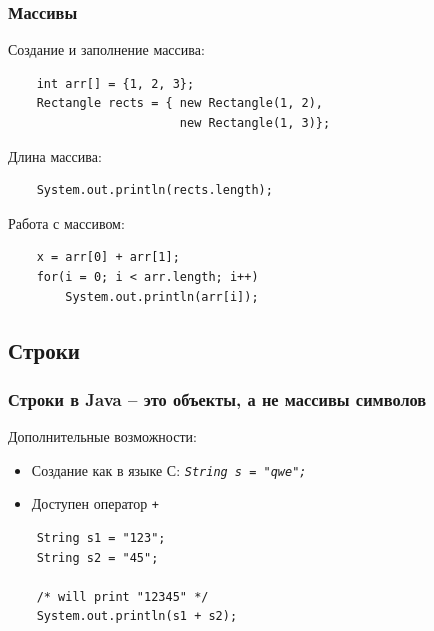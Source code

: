 \begin{frame}[fragile]
	\frametitle{Массивы}

	\begin{Large}
	Создание и заполнение массива:
	\begin{verbatim}
	int arr[] = {1, 2, 3};
	Rectangle rects = { new Rectangle(1, 2),
	                    new Rectangle(1, 3)};
	\end{verbatim}

	Длина массива:
	\begin{verbatim}
	System.out.println(rects.length);
	\end{verbatim}

	Работа с массивом:
	\begin{verbatim}
	x = arr[0] + arr[1];
	for(i = 0; i < arr.length; i++)
	    System.out.println(arr[i]);
	\end{verbatim}

	\end{Large}
\end{frame}

\subsection{Строки}
\begin{frame}[fragile]
	\begin{Large}
	\frametitle{Строки в Java -- это объекты, а не массивы символов}

	Дополнительные возможности:
	\begin{itemize}
	\item{Создание как в языке С: \emph{\texttt{String s = "qwe";}}}
	\item{Доступен оператор \texttt{+}}
	\end{itemize}
	\medskip
	\begin{verbatim}
	String s1 = "123";
	String s2 = "45";

	/* will print "12345" */
	System.out.println(s1 + s2);
	\end{verbatim}
	\end{Large}
\end{frame}

